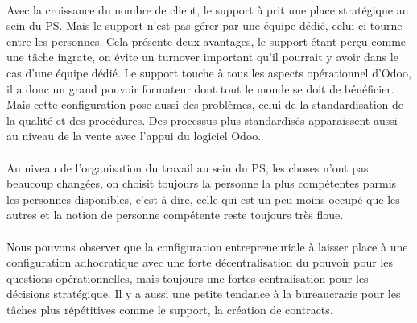\paragraph{} Avec la croissance du nombre de client, le support à prit une place stratégique au sein du PS. Mais le support n'est pas gérer par une équipe dédié, celui-ci tourne entre les personnes. Cela présente deux avantages, le support étant perçu comme une tâche ingrate, on évite un turnover important qu'il pourrait y avoir dans le cas d'une équipe dédié. Le support touche à tous les aspects opérationnel d'Odoo, il a donc un grand pouvoir formateur dont tout le monde se doit de bénéficier. Mais cette configuration pose aussi des problèmes, celui de la standardisation de la qualité et des procédures. Des processus plus standardisés apparaissent aussi au niveau de la vente avec l'appui du logiciel Odoo. 

\paragraph{} Au niveau de l'organisation du travail au sein du PS, les choses n'ont pas beaucoup changées, on choisit toujours la personne la plus compétentes parmis les personnes disponibles, c'est-à-dire, celle qui est un peu moins occupé que les autres et la notion de personne compétente reste toujours très floue. 

\paragraph{} Nous pouvons observer que la configuration entrepreneuriale à laisser place à une configuration adhocratique\citep[pp. 53-54]{pichault} avec une forte décentralisation du pouvoir pour les questions opérationnelles, mais toujours une fortes centralisation pour les décisions stratégique. Il y a aussi une petite tendance à la bureaucracie pour les tâches plus répétitives comme le support, la création de contracts. 


